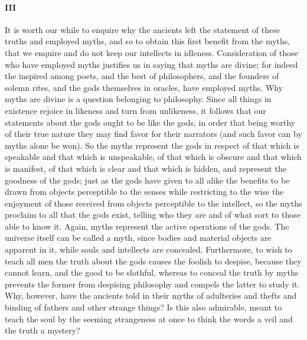 \documentclass[12pt]{article}
\begin{document}
\paragraph{III} It is worth our while to enquire why the ancients left the
statement of these truths and employed myths, and so to obtain this first
benefit from the myths, that we enquire and do not keep our intellects in
idleness. Consideration of those who have employed myths justifies us in saying
that myths are divine; for indeed the inspired among poets, and the best of
philosophers, and the founders of solemn rites, and the gods themselves in
oracles, have employed myths. Why myths are divine is a question belonging to
philosophy. Since all things in existence rejoice in likeness and turn from
unlikeness, it follows that our statements about the gods ought to be like the
gods, in order that being worthy of their true nature they may find favor for
their narrators (and such favor can by myths alone be won). So the myths
represent the gods in respect of that which is speakable and that which is
unspeakable, of that which is obscure and that which is manifest, of that which
is clear and that which is hidden, and represent the goodness of the gods; just
as the gods have given to all alike the benefits to be drawn from objects
perceptible to the senses while restricting to the wise the enjoyment of those
received from objects perceptible to the intellect, so the myths proclaim to
all that the gods exist, telling who they are and of what sort to those able to
know it. Again, myths represent the active operations of the gods. The universe
itself can be called a myth, since bodies and material objects are apparent in
it, while souls and intellects are concealed. Furthermore, to wish to teach all
men the truth about the gods causes the foolish to despise, because they cannot
learn, and the good to be slothful, whereas to conceal the truth by myths
prevents the former from despising philosophy and compels the latter to study
it. Why, however, have the ancients told in their myths of adulteries and
thefts and binding of fathers and other strange things? Is this also admirable,
meant to teach the soul by the seeming strangeness at once to think the words a
veil and the truth a mystery?
\end{document}
